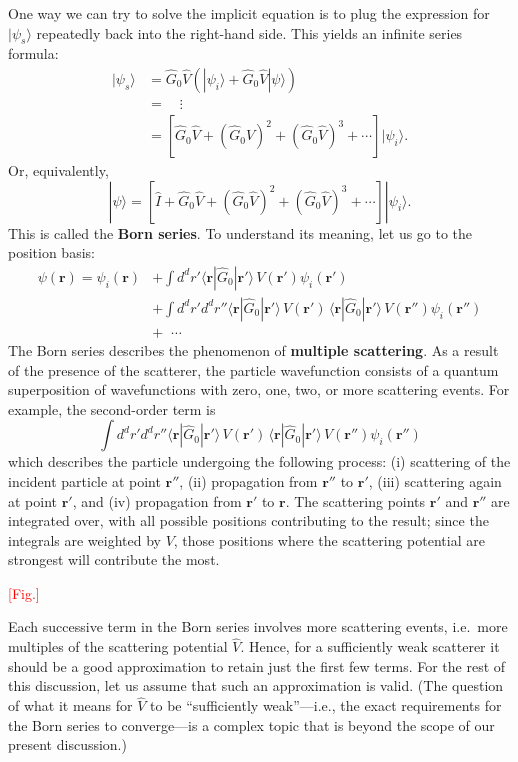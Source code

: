 \documentclass[pra,12pt]{revtex4}
\begin{document}
One way we can try to solve the implicit equation is to plug the
expression for $|\psi_s\rangle$ repeatedly back into the right-hand
side.  This yields an infinite series formula:
$$\begin{aligned}|\psi_s\rangle &= \hat{G}_0 \hat{V} \left(|\psi_i\rangle + \hat{G}_0 \hat{V}|\psi\rangle\right) \\ &= \quad \vdots \\ &= \left[\hat{G}_0 \hat{V} + (\hat{G}_0 \hat{V})^2 + (\hat{G}_0 \hat{V})^3 + \cdots\right]|\psi_i\rangle.\end{aligned}$$
Or, equivalently,
$$|\psi\rangle = \left[\hat{I} + \hat{G}_0 \hat{V} + (\hat{G}_0 \hat{V})^2 + (\hat{G}_0 \hat{V})^3 + \cdots\right]|\psi_i\rangle.$$
This is called the \textbf{Born series}.  To understand its meaning,
let us go to the position basis:
$$\begin{aligned}\psi(\mathbf{r}) = \psi_i(\mathbf{r}) &+ \int d^dr' \langle \mathbf{r} | \hat{G}_0 |\mathbf{r}'\rangle\, V(\mathbf{r}') \psi_i(\mathbf{r}') \\ &+ \int d^dr' d^dr'' \langle \mathbf{r} | \hat{G}_0 |\mathbf{r}'\rangle\, V(\mathbf{r}') \, \langle \mathbf{r} | \hat{G}_0 |\mathbf{r}'\rangle \, V(\mathbf{r}'') \psi_i(\mathbf{r}'') \\ &+ \;\;\cdots\end{aligned}$$
The Born series describes the phenomenon of \textbf{multiple
  scattering}.  As a result of the presence of the scatterer, the
particle wavefunction consists of a quantum superposition of
wavefunctions with zero, one, two, or more scattering events.  For
example, the second-order term is
$$\int d^dr' d^dr'' \langle \mathbf{r} | \hat{G}_0 |\mathbf{r}'\rangle\, V(\mathbf{r}') \, \langle \mathbf{r} | \hat{G}_0 |\mathbf{r}'\rangle \, V(\mathbf{r}'') \psi_i(\mathbf{r}'')$$
which describes the particle undergoing the following process: (i)
scattering of the incident particle at point $\mathbf{r}''$, (ii)
propagation from $\mathbf{r}''$ to $\mathbf{r}'$, (iii) scattering
again at point $\mathbf{r}'$, and (iv) propagation from $\mathbf{r}'$
to $\mathbf{r}$.  The scattering points $\mathbf{r}'$ and
$\mathbf{r}''$ are integrated over, with all possible positions
contributing to the result; since the integrals are weighted by $V$,
those positions where the scattering potential are strongest will
contribute the most.

\textcolor{red}{[Fig.]}

Each successive term in the Born series involves more scattering
events, i.e.~more multiples of the scattering potential $\hat{V}$.
Hence, for a sufficiently weak scatterer it should be a good
approximation to retain just the first few terms.  For the rest of
this discussion, let us assume that such an approximation is valid.
(The question of what it means for $\hat{V}$ to be
``sufficiently weak''---i.e., the exact requirements for the Born
series to converge---is a complex topic that is beyond the scope of
our present discussion.)
\end{document}
